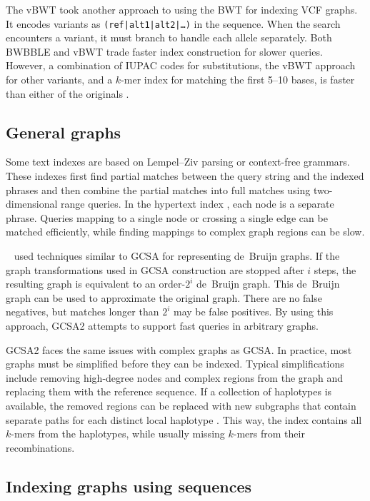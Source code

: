 The vBWT \cite{Maciuca_2016} took another approach to using the BWT for indexing VCF graphs.
It encodes variants as \texttt{(ref|alt1|alt2|\dots)} in the sequence.
When the search encounters a variant, it must branch to handle each allele separately.
Both BWBBLE and vBWT trade faster index construction for slower queries.
However, a combination of IUPAC codes for substitutions, the vBWT approach for other variants, and a $k$-mer index for matching the first 5--10 bases, is faster than either of the originals \cite{Buechler_2019}.

\subsection{General graphs}

Some text indexes are based on Lempel--Ziv parsing or context-free grammars.
These indexes first find partial matches between the query string and the indexed phrases and then combine the partial matches into full matches using two-dimensional range queries.
In the hypertext index \cite{Thachuk_2013}, each node is a separate phrase.
Queries mapping to a single node or crossing a single edge can be matched efficiently, while finding mappings to complex graph regions can be slow.

\citeauthor{Bowe_2012}\ \cite{Bowe_2012} used techniques similar to GCSA for representing de~Bruijn graphs.
If the graph transformations used in GCSA construction are stopped after $i$ steps, the resulting graph is equivalent to an order-$2^{i}$ de~Bruijn graph.
This de~Bruijn graph can be used to approximate the original graph.
There are no false negatives, but matches longer than $2^{i}$ may be false positives.
By using this approach, GCSA2 \cite{Siren_2017} attempts to support fast queries in arbitrary graphs.

GCSA2 faces the same issues with complex graphs as GCSA.
In practice, most graphs must be simplified before they can be indexed.
Typical simplifications include removing high-degree nodes and complex regions from the graph and replacing them with the reference sequence.
If a collection of haplotypes is available, the removed regions can be replaced with new subgraphs that contain separate paths for each distinct local haplotype \cite{Siren_2019}.
This way, the index contains all $k$-mers from the haplotypes, while usually missing $k$-mers from their recombinations.

\subsection{Indexing graphs using sequences}

